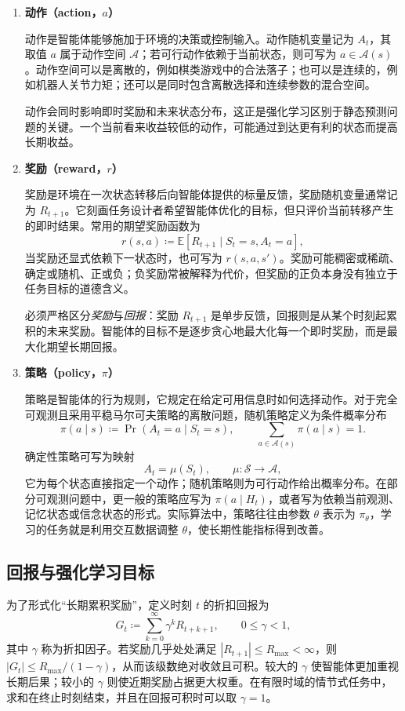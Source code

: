 \begin{enumerate}[label=\textbf{\arabic*.},leftmargin=3em]
  \item \textbf{动作（action，$a$）}


  动作是智能体能够施加于环境的决策或控制输入。动作随机变量记为 $A_t$，其取值 $a$ 属于动作空间 $\mathcal{A}$；若可行动作依赖于当前状态，则可写为 $a\in\mathcal{A}(s)$。动作空间可以是离散的，例如棋类游戏中的合法落子；也可以是连续的，例如机器人关节力矩；还可以是同时包含离散选择和连续参数的混合空间。


  动作会同时影响即时奖励和未来状态分布，这正是强化学习区别于静态预测问题的关键。一个当前看来收益较低的动作，可能通过到达更有利的状态而提高长期收益。


  \item \textbf{奖励（reward，$r$）}


  奖励是环境在一次状态转移后向智能体提供的标量反馈，奖励随机变量通常记为 $R_{t+1}$。它刻画任务设计者希望智能体优化的目标，但只评价当前转移产生的即时结果。常用的期望奖励函数为
  \[
    r(s,a)
    \coloneqq \mathbb{E}\!\left[R_{t+1}\mid S_t=s,A_t=a\right],
  \]
  当奖励还显式依赖下一状态时，也可写为 $r(s,a,s')$。奖励可能稠密或稀疏、确定或随机、正或负；负奖励常被解释为代价，但奖励的正负本身没有独立于任务目标的道德含义。


  必须严格区分\emph{奖励}与\emph{回报}：奖励 $R_{t+1}$ 是单步反馈，回报则是从某个时刻起累积的未来奖励。智能体的目标不是逐步贪心地最大化每一个即时奖励，而是最大化期望长期回报。


  \item \textbf{策略（policy，$\pi$）}


  策略是智能体的行为规则，它规定在给定可用信息时如何选择动作。对于完全可观测且采用平稳马尔可夫策略的离散问题，随机策略定义为条件概率分布
  \[
    \pi(a\mid s)
    \coloneqq \Pr(A_t=a\mid S_t=s),
    \qquad
    \sum_{a\in\mathcal{A}(s)}\pi(a\mid s)=1.
  \]
  确定性策略可写为映射
  \[
    A_t=\mu(S_t),
    \qquad \mu:\mathcal{S}\to\mathcal{A},
  \]
  它为每个状态直接指定一个动作；随机策略则为可行动作给出概率分布。在部分可观测问题中，更一般的策略应写为 $\pi(a\mid H_t)$，或者写为依赖当前观测、记忆状态或信念状态的形式。实际算法中，策略往往由参数 $\theta$ 表示为 $\pi_\theta$，学习的任务就是利用交互数据调整 $\theta$，使长期性能指标得到改善。
\end{enumerate}


\subsection{回报与强化学习目标}


为了形式化“长期累积奖励”，定义时刻 $t$ 的折扣回报为
\begin{equation}
  G_t
  \coloneqq
  \sum_{k=0}^{\infty}\gamma^k R_{t+k+1},
  \qquad 0\leq \gamma<1,
  \label{eq:discounted-return}
\end{equation}
其中 $\gamma$ 称为折扣因子。若奖励几乎处处满足 $|R_{t+1}|\leq R_{\max}<\infty$，则 $|G_t|\leq R_{\max}/(1-\gamma)$，从而该级数绝对收敛且可积。较大的 $\gamma$ 使智能体更加重视长期后果；较小的 $\gamma$ 则使近期奖励占据更大权重。在有限时域的情节式任务中，求和在终止时刻结束，并且在回报可积时可以取 $\gamma=1$。


